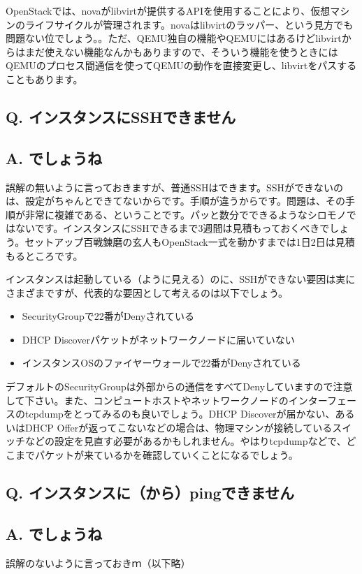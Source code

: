 \documentclass[9pt,b5paper,tombo,openany]{jsbook}
\begin{document}
OpenStackでは、novaがlibvirtが提供するAPIを使用することにより、仮想マシンのライフサイクルが管理されます。novaはlibvirtのラッパー、という見方でも問題ない位でしょう。。ただ、QEMU独自の機能やQEMUにはあるけどlibvirtからはまだ使えない機能なんかもありますので、そういう機能を使うときにはQEMUのプロセス間通信を使ってQEMUの動作を直接変更し、libvirtをパスすることもあります。

\subsection*{{\LARGE\bfseries Q.} インスタンスにSSHできません}
\subsection*{{\LARGE\bfseries A.} でしょうね}
誤解の無いように言っておきますが、普通SSHはできます。SSHができないのは、設定がちゃんとできてないからです。手順が違うからです。問題は、その手順が非常に複雑である、ということです。パッと数分でできるようなシロモノではないです。インスタンスにSSHできるまで3週間は見積もっておくべきでしょう。セットアップ百戦錬磨の玄人もOpenStack一式を動かすまでは1日2日は見積もるところです。

インスタンスは起動している（ように見える）のに、SSHができない要因は実にさまざまですが、代表的な要因として考えるのは以下でしょう。
\begin{itemize}
	\item SecurityGroupで22番がDenyされている
	\item DHCP Discoverパケットがネットワークノードに届いていない
	\item インスタンスOSのファイヤーウォールで22番がDenyされている
\end{itemize}
デフォルトのSecurityGroupは外部からの通信をすべてDenyしていますので注意して下さい。また、コンピュートホストやネットワークノードのインターフェースのtcpdumpをとってみるのも良いでしょう。DHCP Discoverが届かない、あるいはDHCP Offerが返ってこないなどの場合は、物理マシンが接続しているスイッチなどの設定を見直す必要があるかもしれません。やはりtcpdumpなどで、どこまでパケットが来ているかを確認していくことになるでしょう。

\subsection*{{\LARGE\bfseries Q.} インスタンスに（から）pingできません}
\subsection*{{\LARGE\bfseries A.} でしょうね}
誤解のないように言っておきｍ（以下略）
\end{document}
